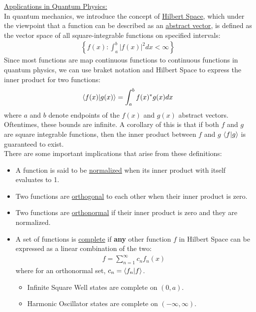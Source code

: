 \documentclass{article}
\newcommand{\gap}{\medskip\\}
\newcommand{\sheader}[1]{\underline{#1:}}
\newcommand{\curly}[1]{\left\{#1\right\}}
\begin{document}
    \sheader{Applications in Quantum Physics}
    \gap
    In quantum mechanics, we introduce the concept of \underline{Hilbert Space}, which 
    under the viewpoint that a function can be described as an \underline{abstract vector},
    is defined as the vector space of all square-integrable functions on specified intervals:
    \begin{align*}
        \curly{f(x) : \int_a^b |f(x)|^2 dx < \infty}
    \end{align*}
    Since most functions are map continuous functions to continuous functions in quantum 
    physics, we can use braket notation and Hilbert Space to express the inner product 
    for two functions:
    \begin{align*}
        \braket{f(x)}{g(x)} = \int_a^b f(x)^* g(x)dx
    \end{align*}
    where $a$ and $b$ denote endpoints of the $f(x)$ and $g(x)$ abstract vectors. Oftentimes,
    these bounds are infinite. A corollary of this is that if both $f$ and $g$ are square integrable
    functions, then the inner product between $f$ and $g$ $\braket{f}{g}$ is guaranteed to exist.
    \pagebreak
    \gap
    There are some important implications that arise from these definitions:
    \begin{itemize}
        \item A function is said to be \underline{normalized} when its inner product with itself 
        evaluates to 1.
        \item Two functions are \underline{orthogonal} to each other when their inner product 
        is zero.
        \item Two functions are \underline{orthonormal} if their inner product is zero and they 
        are normalized.
        \item A set of functions is \underline{complete} if \textbf{any} other function $f$ in 
        Hilbert Space can be expressed as a linear combination of the two:
        \begin{align*}
            f = \sum_{n=1}^\infty c_n f_n(x)
        \end{align*}
        where for an orthonormal set, $c_n = \braket{f_n}{f}$.
        \begin{itemize}
            \item Infinite Square Well states are complete on $(0, a)$.
            \item Harmonic Oscillator states are complete on $(-\infty, \infty)$.
        \end{itemize}
    \end{itemize}
\end{document}
